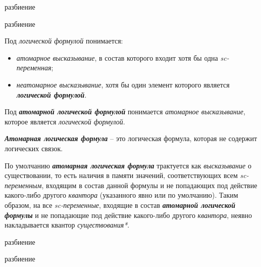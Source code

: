 \begin{SCn}
\begin{scnrelfromset}{разбиение}
\end{scnrelfromset}
\begin{scnrelfromset}{разбиение}
\end{scnrelfromset}
\end{SCn}

Под \textit{логической формулой} понимается:
\begin{itemize}
	\item \textit{атомарное высказывание}, в состав которого входит хотя бы одна \textit{sc-переменная};
	\item \textit{неатомарное высказывание}, хотя бы один элемент которого является \textbf{\textit{логической формулой}}.
\end{itemize}

Под \textbf{\textit{атомарной логической формулой}} понимается \textit{атомарное высказывание}, которое является \textit{логической формулой}.

\textbf{\textit{Атомарная логическая формула}} -- это  логическая формула, которая не содержит логических связок.

По умолчанию \textbf{\textit{атомарная логическая формула}} трактуется как \textit{высказывание} о существовании, то есть наличия в памяти значений, соответствующих всем \textit{sc-переменным}, входящим в состав данной формулы и не попадающих под действие какого-либо другого \textit{квантора} (указанного явно или по умолчанию). Таким образом, на все \textit{sc-переменные}, входящие в состав \textbf{\textit{атомарной логической формулы}} и не попадающие под действие какого-либо другого \textit{квантора}, неявно накладывается квантор \textit{существования*}.

\begin{SCn}
\begin{scnrelfromset}{разбиение}
\end{scnrelfromset}
\begin{scnrelfromset}{разбиение}
\end{scnrelfromset}
\end{SCn}

